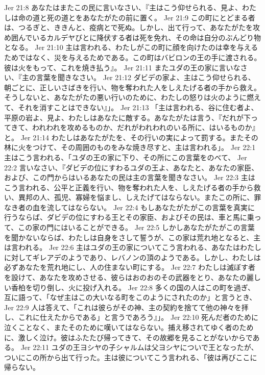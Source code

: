 Jer 21:8  あなたはまたこの民に言いなさい、『主はこう仰せられる、見よ、わたしは命の道と死の道とをあなたがたの前に置く。
Jer 21:9  この町にとどまる者は、つるぎと、ききんと、疫病とで死ぬ。しかし、出て行って、あなたがたを攻め囲んでいるカルデヤびとに降伏する者は死を免れ、その命は自分のぶんどり物となる。
Jer 21:10  主は言われる、わたしがこの町に顔を向けたのは幸を与えるためではなく、災を与えるためである。この町はバビロンの王の手に渡される。彼は火をもって、これを焼き払う』。
Jer 21:11  またユダの王の家に言いなさい、『主の言葉を聞きなさい。
Jer 21:12  ダビデの家よ、主はこう仰せられる、朝ごとに、正しいさばきを行い、物を奪われた人をしえたげる者の手から救え。そうしないと、あなたがたの悪い行いのために、わたしの怒りは火のように燃えて、それを消すことはできない』」。
Jer 21:13  「主は言われる、谷に住む者よ、平原の岩よ、見よ、わたしはあなたに敵する。あなたがたは言う、『だれが下ってきて、われわれを攻めるものか、だれがわれわれのいる所に、はいるものか』と。
Jer 21:14  わたしはあなたがたを、その行いの実によって罰する。またその林に火をつけて、その周囲のものをみな焼き尽すと、主は言われる」。
Jer 22:1  主はこう言われる、「ユダの王の家に下り、その所にこの言葉をのべて、
Jer 22:2  言いなさい、『ダビデの位にすわるユダの王よ、あなたと、あなたの家臣、および、この門からはいるあなたの民は主の言葉を聞きなさい。
Jer 22:3  主はこう言われる、公平と正義を行い、物を奪われた人を、しえたげる者の手から救い、異邦の人、孤児、寡婦を悩まし、しえたげてはならない。またこの所に、罪なき者の血を流してはならない。
Jer 22:4  もしあなたがたがこの言葉を真実に行うならば、ダビデの位にすわる王とその家臣、およびその民は、車と馬に乗って、この家の門にはいることができる。
Jer 22:5  しかしあなたがたがこの言葉を聞かないならば、わたしは自身をさして誓うが、この家は荒れ地となると、主は言われる。
Jer 22:6  主はユダの王の家についてこう言われる、あなたはわたしに対してギレアデのようであり、レバノンの頂のようである。しかし、わたしは必ずあなたを荒れ地にし、人の住まない町にする。
Jer 22:7  わたしは滅ぼす者を設けて、あなたを攻めさせる、彼らはおのおのその武器をとり、あなたの麗しい香柏を切り倒し、火に投げ入れる。
Jer 22:8  多くの国の人はこの町を過ぎ、互に語って、「なぜ主はこの大いなる町をこのようにされたのか」と言うとき、
Jer 22:9  人は答えて、「これは彼らがその神、主の契約を捨てて他の神々を拝し、これに仕えたからである」と言うであろう』」。
Jer 22:10  死んだ者のために泣くことなく、またそのために嘆いてはならない。捕え移されてゆく者のために、激しく泣け。彼はふたたび帰ってきて、その故郷を見ることがないからである。
Jer 22:11  ユダの王ヨシヤの子シャルムは父ヨシヤについで王となったが、ついにこの所から出て行った。主は彼についてこう言われる、「彼は再びここに帰らない。
